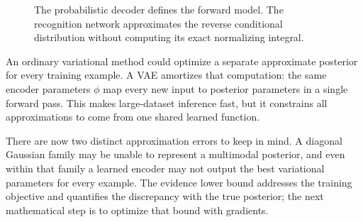 \begin{figure}[H]
\centering
{}
\caption{The probabilistic decoder defines the forward model. The recognition network approximates the reverse conditional distribution without computing its exact normalizing integral.}
\end{figure}

An ordinary variational method could optimize a separate approximate posterior for every training example. A VAE amortizes that computation: the same encoder parameters \(\phi\) map every new input to posterior parameters in a single forward pass. This makes large-dataset inference fast, but it constrains all approximations to come from one shared learned function.

There are now two distinct approximation errors to keep in mind. A diagonal Gaussian family may be unable to represent a multimodal posterior, and even within that family a learned encoder may not output the best variational parameters for every example. The evidence lower bound addresses the training objective and quantifies the discrepancy with the true posterior; the next mathematical step is to optimize that bound with gradients.
